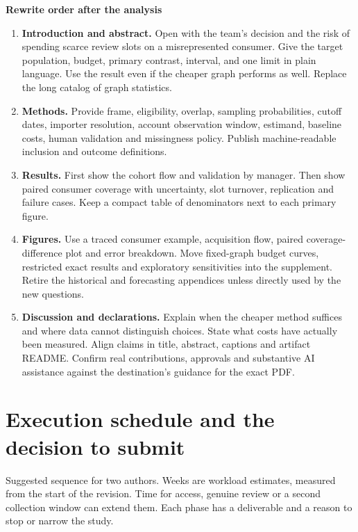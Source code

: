 \documentclass[11pt,a4paper]{article}
\newcommand{\pg}[1]{\newpage\section{\color{ink}#1}}
\newcommand{\hd}[1]{\par\textbf{\color{accent}#1}\par\nopagebreak}
\begin{document}
\hd{Rewrite order after the analysis}
\begin{enumerate}
\item \textbf{Introduction and abstract.} Open with the team's decision and the risk of spending scarce review slots on a misrepresented consumer. Give the target population, budget, primary contrast, interval, and one limit in plain language. Use the result even if the cheaper graph performs as well. Replace the long catalog of graph statistics.
\item \textbf{Methods.} Provide frame, eligibility, overlap, sampling probabilities, cutoff dates, importer resolution, account observation window, estimand, baseline costs, human validation and missingness policy. Publish machine-readable inclusion and outcome definitions.
\item \textbf{Results.} First show the cohort flow and validation by manager. Then show paired consumer coverage with uncertainty, slot turnover, replication and failure cases. Keep a compact table of denominators next to each primary figure.
\item \textbf{Figures.} Use a traced consumer example, acquisition flow, paired coverage-difference plot and error breakdown. Move fixed-graph budget curves, restricted exact results and exploratory sensitivities into the supplement. Retire the historical and forecasting appendices unless directly used by the new questions.
\item \textbf{Discussion and declarations.} Explain when the cheaper method suffices and where data cannot distinguish choices. State what costs have actually been measured. Align claims in title, abstract, captions and artifact README. Confirm real contributions, approvals and substantive AI assistance against the destination's guidance for the exact PDF.
\end{enumerate}

\pg{Execution schedule and the decision to submit}
Suggested sequence for two authors. Weeks are workload estimates, measured from the start of the revision. Time for access, genuine review or a second collection window can extend them. Each phase has a deliverable and a reason to stop or narrow the study.
\end{document}
